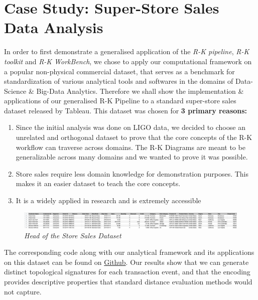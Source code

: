 \section{Case Study: Super-Store Sales Data Analysis}
\label{sec:store_sales_section}

In order to first demonstrate a generalised application of the \textit{R-K pipeline}, \textit{R-K toolkit} and \textit{R-K WorkBench}, we chose to apply our computational framework on a popular non-physical commercial dataset, that serves as a benchmark for standardization of various analytical tools and softwares in the domains of Data-Science \& Big-Data Analytics. Therefore we shall show the implementation \& applications of our generalised R-K Pipeline to a standard super-store sales dataset released by Tableau.\cite{TableauSuperStore} This dataset was chosen for \textbf{3 primary reasons:}

\begin{enumerate}
        \item{Since the initial analysis was done on LIGO data, we decided to choose an unrelated and orthogonal dataset to prove that the core concepts of the R-K workflow can traverse across domains. The R-K Diagrams are meant to be generalizable across many domains and we wanted to prove it was possible.}
        \item{Store sales require less domain knowledge for demonstration purposes. This makes it an easier dataset to teach the core concepts.}
        \item{It is a widely applied in research and is extremely accessible}
\end{enumerate}

\begin{figure}[t]
	\centering
        \includegraphics[width=1\textwidth]{images/store_sales_dataset.png}
	\caption{\textit{Head of the Store Sales Dataset}}
	\label{fig:sample store sales dataset}
\end{figure}

The corresponding code along with our analytical framework and its applications on this dataset can be found on \href{https://github.com/andorsk/store_sales}{Github}. Our results show that we can generate distinct topological signatures for each transaction event, and that the encoding provides descriptive properties that standard distance evaluation methods would not capture.

